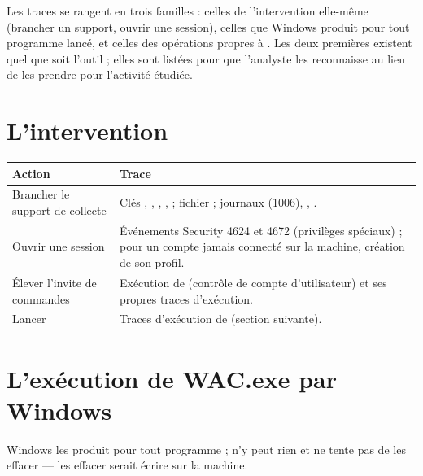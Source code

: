 \documentclass[11pt,a4paper,oneside]{report}
\begin{document}
Les traces se rangent en trois familles : celles de l'intervention elle-même
(brancher un support, ouvrir une session), celles que Windows produit pour tout
programme lancé, et celles des opérations propres à \wac{}. Les deux premières
existent quel que soit l'outil ; elles sont listées pour que l'analyste les
reconnaisse au lieu de les prendre pour l'activité étudiée.

\section{L'intervention}

\begin{longtable}{@{}L{4.3cm}L{10.1cm}@{}}
\toprule
\bfseries Action & \bfseries Trace \\
\midrule
\endhead
Brancher le support de collecte & Clés , ,
  , ,
   ; fichier  ; journaux
   (1006),
  , . \\
Ouvrir une session & Événements Security 4624 et 4672 (privilèges spéciaux) ;
  pour un compte jamais connecté sur la machine, création de son profil. \\
Élever l'invite de commandes & Exécution de  (contrôle de
  compte d'utilisateur) et ses propres traces d'exécution. \\
Lancer  & Traces d'exécution de 
  (section suivante). \\
\bottomrule
\end{longtable}

\section{L'exécution de WAC.exe par Windows}

Windows les produit pour tout programme ; \wac{} n'y peut rien et ne tente pas
de les effacer — les effacer serait écrire sur la machine.
\end{document}
